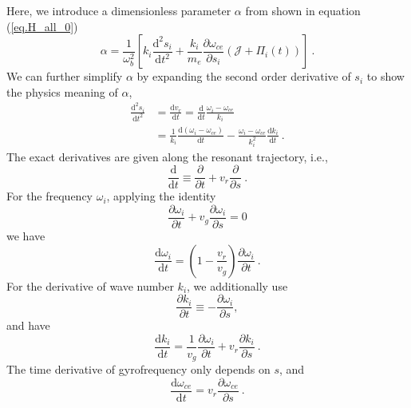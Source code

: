 Here, we introduce a dimensionless parameter $\alpha$ from shown in equation (\ref{eq.H_all_0})
\begin{equation}\label{eq.alp0}
    \alpha = \frac{1}{\omega_b^2}\left[k_i \frac{\mathrm{d}^{2} s_{i}}{\mathrm{d} t^{2}}+ \frac{k_i}{m_{e}} \frac{\partial \omega_{ce}}{\partial s_{i}}\left(\mathcal{J}+\Pi_{i}(t)\right)\right]~.
\end{equation}
We can further simplify $\alpha$ by expanding the second order derivative of $s_i$ to show the physics meaning of $\alpha$, 
\begin{equation}
    \begin{aligned}
    \frac{\mathrm{d^2}s_i}{\mathrm{d}t^2} &= \frac{\mathrm{d}v_r}{\mathrm{d}t} = \frac{\mathrm{d}}{\mathrm{d}t} \frac{\omega_i - \omega_{ce}}{k_i}
    \\
    & = \frac{1}{k_i}\frac{\mathrm{d}(\omega_i - \omega_{ce})}{\mathrm{d}t} - \frac{\omega_i - \omega_{ce}}{k_i^2}\frac{\mathrm{d}k_i}{\mathrm{d}t}~.
    \end{aligned}
\end{equation}
The exact derivatives are given along the resonant trajectory, i.e.,
\begin{equation}
    \frac{\mathrm{d}}{\mathrm{d}t} \equiv \frac{\partial }{\partial t} + v_r \frac{\partial }{\partial s}~.
\end{equation}
For the frequency $\omega_i$, applying the identity
\begin{equation}
    \frac{\partial \omega_i}{\partial t} + v_g \frac{\partial \omega_i}{\partial s} = 0
\end{equation}
we have 
\begin{equation}
    \frac{\mathrm{d}\omega_i}{\mathrm{d}t} = \left(1-\frac{v_r}{v_g}\right) \frac{\partial \omega_i}{\partial t}~.
\end{equation}
For the derivative of wave number $k_i$, we additionally use
\begin{equation}
    \frac{\partial k_i}{\partial t} \equiv - \frac{\partial \omega_i}{\partial s},
\end{equation}
and have
\begin{equation}
    \frac{\mathrm{d}k_i}{\mathrm{d}t} = \frac{1}{v_g}\frac{\partial \omega_i}{\partial t} + v_r \frac{\partial k_i}{\partial s}~.
\end{equation}
The time derivative of gyrofrequency only depends on $s$, and
\begin{equation}
    \frac{\mathrm{d}\omega_{ce}}{\mathrm{d}t} = v_r \frac{\partial \omega_{ce}}{\partial s}~.
\end{equation}
